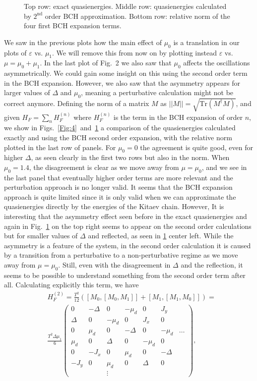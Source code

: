 \documentclass[11pt]{report}
\newcommand{\en}{\varepsilon}
\begin{document}
\begin{figure}
\caption{Top row: exact quasienergies. Middle row: quasienergies calculated by $2^{\text{nd}}$ order BCH approximation. Bottom row: relative norm of the four first BCH expansion terms.}
\label{Fig:5}
\end{figure}

We saw in the previous plots how the main effect of $\mu_0$ is a translation in our plots of $\en$ vs. $\mu_1$. We will remove this from now on by plotting instead $\en$ vs. $\mu = \mu_0 + \mu_1$. In the last plot of Fig.~2 we also saw that $\mu_0$ affects the oscillations asymmetrically. We could gain some insight on this using the second order term in the BCH expansion. However, we also saw that the asymmetry appears for larger values of $\Delta$ and $\mu_0$, meaning a perturbative calculation might not be correct anymore. Defining the norm of a matrix $M$ as $||M|| = \sqrt{\mathrm{Tr}( M^{\dagger}M)}$, and given $H_F = \sum_n H_F^{(n)}$ where $H_F^{(n)}$ is the term in the BCH expansion of order $n$, we show in Figs.~\ref{Fig:4}~and~\ref{Fig:5} a comparison of the quasienergies calculated exactly and using the BCH second order expansion, with the relative norm plotted in the last row of panels. For $\mu_0 = 0$ the agreement is quite good, even for higher $\Delta$, as seen clearly in the first two rows but also in the norm. When $\mu_0 = 1.4$, the disagreement is clear as we move away from $\mu = \mu_0$, and we see in the last panel that eventually higher order terms are more relevant and the perturbation approach is no longer valid. It seems that the BCH expansion approach is quite limited since it is only valid when we can approximate the quasienergies directly by the energies of the Kitaev chain. However, It is interesting that the asymmetry effect seen before in the exact quasienergies and again in Fig.~\ref{Fig:5} on the top right seems to appear on the second order calculations but for smaller values of $\Delta$ and reflected, as seen in \ref{Fig:5} center left. While the asymmetry is a feature of the system, in the second order calculation it is caused by a transition from a perturbative to a non-perturbative regime as we move away from $\mu = \mu_0$. Still, even with the disagreement in $\Delta$ and the reflection, it seems to be possible to understand something from the second order term after all. Calculating explicitly this term, we have
%
\begin{equation} 
\begin{split}
  &H_F^{(2)} = \frac{T^2}{12}( [M_0,[M_0,M_1]]+[M_1,[M_1,M_0]] ) =\\
  &\frac{T^2 \Delta \mu_1}{6} \left(\begin{matrix}
0 & - \Delta & 0 & - \mu_d & 0 & J_y \\
 \Delta & 0 & - \mu_d & 0 & J_x & 0 \\
 0 &  \mu_d & 0 & - \Delta & 0 & - \mu_d  & \dots \\ 
 \mu_d & 0 & \Delta & 0 & - \mu_d & 0 \\ 
 0 & - J_x & 0 & \mu_d & 0 & - \Delta \\ 
 - J_y & 0 & \mu_d & 0 & \Delta & 0\\ 
  & & \vdots & & & & 
  \end{matrix} \right),
\end{split}
\end{equation}
\end{document}

